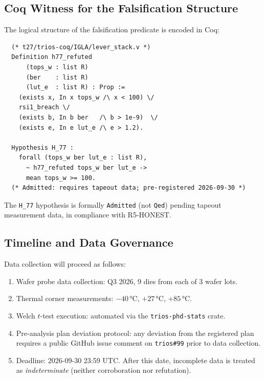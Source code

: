 \subsection{Coq Witness for the Falsification Structure}

The logical structure of the falsification predicate is encoded in Coq:
\begin{verbatim}
  (* t27/trios-coq/IGLA/lever_stack.v *)
  Definition h77_refuted
      (tops_w : list R)
      (ber    : list R)
      (lut_e  : list R) : Prop :=
    (exists x, In x tops_w /\ x < 100) \/
    rsi1_breach \/
    (exists b, In b ber   /\ b > 1e-9)  \/
    (exists e, In e lut_e /\ e > 1.2).

  Hypothesis H_77 :
    forall (tops_w ber lut_e : list R),
      ~ h77_refuted tops_w ber lut_e ->
      mean tops_w >= 100.
  (* Admitted: requires tapeout data; pre-registered 2026-09-30 *)
\end{verbatim}

The \texttt{H\_77} hypothesis is formally \texttt{Admitted} (not \texttt{Qed}) pending
tapeout measurement data, in compliance with R5-HONEST.

\subsection{Timeline and Data Governance}

Data collection will proceed as follows:
\begin{enumerate}
  \item Wafer probe data collection: Q3 2026, 9 dies from each of 3 wafer lots.
  \item Thermal corner measurements: $-40\,\text{°C}$, $+27\,\text{°C}$, $+85\,\text{°C}$.
  \item Welch $t$-test execution: automated via the \texttt{trios-phd-stats} crate.
  \item Pre-analysis plan deviation protocol: any deviation from the registered
        plan requires a public GitHub issue comment on \texttt{trios\#99} prior
        to data collection.
  \item Deadline: 2026-09-30 23:59 UTC.  After this date, incomplete data is
        treated as \emph{indeterminate} (neither corroboration nor refutation).
\end{enumerate}

